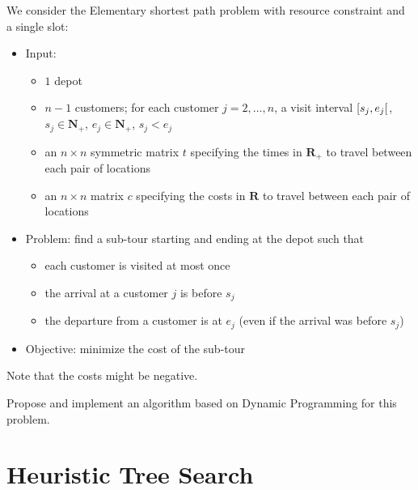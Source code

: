 \documentclass[a4paper,twocolumn]{article}
\newcommand{\N}{\mathbf{N}}
\newcommand{\R}{\mathbf{R}}
\begin{document}
We consider the Elementary shortest path problem with resource constraint and a single slot:
\begin{itemize}
  \item Input:
    \begin{itemize}
      \item $1$ depot
      \item $n - 1$ customers; for each customer $j = 2, \dots, n$, a visit interval $\interval[open right]{s_j}{e_j}$, $s_j \in \N_+$, $e_j \in \N_+$, $s_j < e_j$
      \item an $n \times n$ symmetric matrix $t$ specifying the times in $\R_+$ to travel between each pair of locations
      \item an $n \times n$ matrix $c$ specifying the costs in $\R$ to travel between each pair of locations
    \end{itemize}
  \item Problem: find a sub-tour starting and ending at the depot such that
    \begin{itemize}
      \item each customer is visited at most once
      \item the arrival at a customer $j$ is before $s_j$
      \item the departure from a customer is at $e_j$ (even if the arrival was before $s_j$)
    \end{itemize}
  \item Objective: minimize the cost of the sub-tour
\end{itemize}

Note that the costs might be negative.

Propose and implement an algorithm based on Dynamic Programming for this problem.

\section{Heuristic Tree Search}
\end{document}
